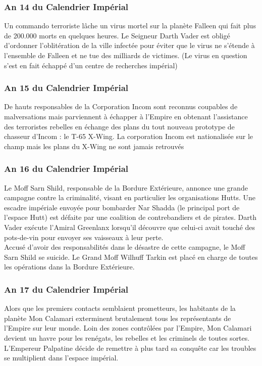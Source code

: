 \documentclass[twoside]{article}
\begin{document}
\subsubsection*{An 14 du Calendrier Impérial}
Un commando terroriste lâche un virus mortel sur la planète Falleen qui fait plus de 200.000 morts en quelques heures. Le Seigneur Darth Vader est obligé d'ordonner l'oblitération de la ville infectée pour éviter que le virus ne s'étende à l'ensemble de Falleen et ne tue des milliards de victimes. (Le virus en question s'est en fait échappé d'un centre de recherches impérial)

\subsubsection*{An 15 du Calendrier Impérial}
De hauts responsables de la Corporation Incom sont reconnus coupables de malversations mais parviennent à échapper à l'Empire en obtenant l'assistance des terroristes rebelles en échange des plans du tout nouveau prototype de chasseur d'Incom : le T-65 X-Wing. La corporation Incom est nationalisée sur le champ mais les plans du X-Wing ne sont jamais retrouvés

\subsubsection*{An 16 du Calendrier Impérial}
Le Moff Sarn Shild, responsable de la Bordure Extérieure, annonce une grande campagne contre la criminalité, visant en particulier les organisations Hutts.
Une escadre impériale envoyée pour bombarder  Nar Shadda (le principal port de l'espace Hutt) est défaite par une coalition de contrebandiers et de pirates. Darth Vader exécute l'Amiral Greenlanx lorsqu'il découvre que celui-ci avait touché des pots-de-vin pour envoyer ses vaisseaux à leur perte.\\

Accusé d'avoir des responsabilités dans le désastre de cette campagne, le Moff Sarn Shild se suicide. Le Grand Moff Wilhuff Tarkin est placé en charge de toutes les opérations dans la Bordure Extérieure.

\subsubsection*{An 17 du Calendrier Impérial}
Alors que les premiers contacts semblaient prometteurs, les habitants de la planète Mon Calamari exterminent brutalement tous les représentants de l'Empire sur leur monde. Loin des zones contrôlées par l'Empire, Mon Calamari devient un havre pour les renégats, les rebelles et les criminels de toutes sortes. L'Empereur Palpatine décide de remettre à plus tard sa conquête car les troubles se multiplient dans l'espace impérial.\\
	
\end{document}
